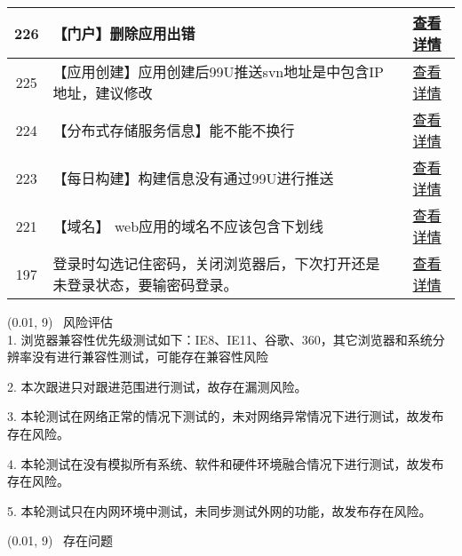 \documentclass{article}
\begin{document}
\begin{table}[H]
\begin{tabular}{|c|p{11cm}|c|}
\hline
226 & 【门户】删除应用出错 & \href{http://pms.sdp.nd/index.php?m=bug\&f=view\&bugID=226}{查看详情}\\
\hline
225 & 【应用创建】应用创建后99U推送svn地址是中包含IP地址，建议修改 & \href{http://pms.sdp.nd/index.php?m=bug\&f=view\&bugID=225}{查看详情}\\
\hline
224 & 【分布式存储服务信息】能不能不换行 & \href{http://pms.sdp.nd/index.php?m=bug\&f=view\&bugID=224}{查看详情}\\
\hline
223 & 【每日构建】构建信息没有通过99U进行推送 & \href{http://pms.sdp.nd/index.php?m=bug\&f=view\&bugID=223}{查看详情}\\
\hline
221 & 【域名】 web应用的域名不应该包含下划线 & \href{http://pms.sdp.nd/index.php?m=bug\&f=view\&bugID=221}{查看详情}\\
\hline
197 & 登录时勾选记住密码，关闭浏览器后，下次打开还是未登录状态，要输密码登录。 & \href{http://pms.sdp.nd/index.php?m=bug\&f=view\&bugID=197}{查看详情}\\
\hline
\end{tabular}
\end{table}

\colorbox{myblue}{\makebox(0.01, 9){\ }} 风险评估\\

1. 浏览器兼容性优先级测试如下：IE8、IE11、谷歌、360，其它浏览器和系统分辨率没有进行兼容性测试，可能存在兼容性风险

2. 本次跟进只对跟进范围进行测试，故存在漏测风险。

3. 本轮测试在网络正常的情况下测试的，未对网络异常情况下进行测试，故发布存在风险。

4. 本轮测试在没有模拟所有系统、软件和硬件环境融合情况下进行测试，故发布存在风险。

5. 本轮测试只在内网环境中测试，未同步测试外网的功能，故发布存在风险。

\colorbox{myblue}{\makebox(0.01, 9){\ }} 存在问题\\
\end{document}
